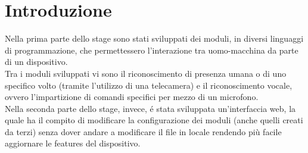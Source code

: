 \chapter*{Introduzione}

Nella prima parte dello stage
sono stati sviluppati dei moduli, in diversi linguaggi di programmazione,
che permettessero l'interazione tra uomo-macchina da parte di un dispositivo.
\\[2\baselineskip]
Tra i moduli sviluppati vi sono il riconoscimento di presenza umana o di uno
specifico volto (tramite l'utilizzo di una telecamera) e il riconoscimento
vocale, ovvero l'impartizione di comandi specifici per mezzo di un microfono.
\\[2\baselineskip]
Nella seconda parte dello stage, invece,
\'e stata sviluppata un'interfaccia web, la quale ha il compito di modificare la configurazione
dei moduli (anche quelli creati da terzi) senza dover andare a modificare il
file in locale rendendo più facile aggiornare le features del dispositivo.
